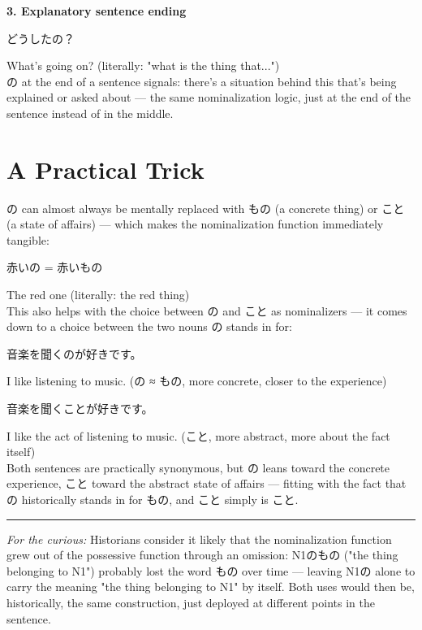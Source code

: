 \documentclass[12pt]{book}
\begin{document}
\textbf{3. Explanatory sentence ending}
\par\quad どうしたの？\\
\par\quad What's going on? (literally: "what is the thing that...")\\

の at the end of a sentence signals: there's a situation behind this that's being explained or asked about — the same nominalization logic, just at the end of the sentence instead of in the middle.

\section*{A Practical Trick}

の can almost always be mentally replaced with もの (a concrete thing) or こと (a state of affairs) — which makes the nominalization function immediately tangible:

\par\quad 赤いの = 赤いもの\\
\par\quad The red one (literally: the red thing)\\

This also helps with the choice between の and こと as nominalizers — it comes down to a choice between the two nouns の stands in for:

\par\quad 音楽を聞くのが好きです。\\
\par\quad I like listening to music. (の ≈ もの, more concrete, closer to the experience)\\

\par\quad 音楽を聞くことが好きです。\\
\par\quad I like the act of listening to music. (こと, more abstract, more about the fact itself)\\

Both sentences are practically synonymous, but の leans toward the concrete experience, こと toward the abstract state of affairs — fitting with the fact that の historically stands in for もの, and こと simply is こと.

\bigskip\hrule\bigskip

\emph{For the curious:} Historians consider it likely that the nominalization function grew out of the possessive function through an omission: N1のもの ("the thing belonging to N1") probably lost the word もの over time — leaving N1の alone to carry the meaning "the thing belonging to N1" by itself. Both uses would then be, historically, the same construction, just deployed at different points in the sentence.
\end{document}
